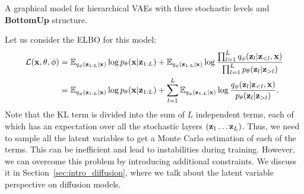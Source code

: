 \begin{marginfigure}
\caption{A graphical model for hierarchical VAEs with three stochastic levels and  \textbf{BottomUp} structure.}\label{fig:intro_bottom_up_vae}
\end{marginfigure}
Let us consider the ELBO for this model:
\begin{align}
    \mathcal{L}(\rvx, \theta, \phi) &= \E_{q_{\phi}(\rvz_{1:L}|\rvx)}\log p_{\theta}(\rvx|\rvz_{1:L}) + \E_{q_{\phi}(\rvz_{1:L}|\rvx)} \log \frac{\prod_{l=1}^L q_{\phi}(\rvz_l|\rvz_{<l}, \rvx)}{\prod_{l=1}^L p_{\theta}(\rvz_l|\rvz_{>l})} \label{eq:intro_bottom_up_elbo_1}\\
    &=\E_{q_{\phi}(\rvz_{1:L}|\rvx)}\log p_{\theta}(\rvx|\rvz_{1:L}) +  \sum_{l=1}^L \E_{q_{\phi}(\rvz_{1:L}|\rvx)}\log \frac{ q_{\phi}(\rvz_l|\rvz_{<l}, \rvx)}{p_{\theta}(\rvz_l|\rvz_{>l})}.\label{eq:intro_bottom_up_elbo_2}
\end{align}
Note that the KL term is divided into the sum of $L$ independent terms, each of which has an expectation over all the stochastic layers $({\mathbf{z}}_1\dots{\mathbf{z}}_L)$. Thus, we need to sample all the latent variables to get a Monte Carlo estimation of each of the terms. This can be inefficient and lead to instabilities during training. 
However, we can overcome this problem by introducing additional constraints. We discuss it in Section~\ref{sec:intro_diffusion}, where we talk about the latent variable perspective on diffusion models. 

